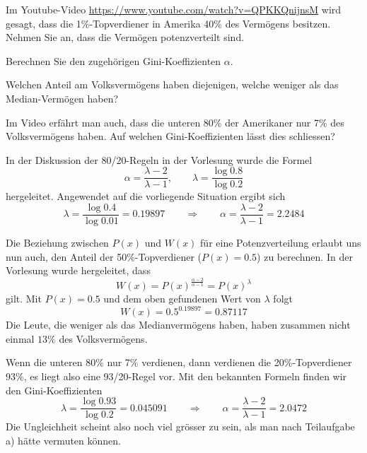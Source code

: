Im Youtube-Video \url{https://www.youtube.com/watch?v=QPKKQnijnsM} wird
gesagt, dass die 1\%-Topverdiener in Amerika 40\% des Vermögens
besitzen. Nehmen Sie an, dass die Vermögen potenzverteilt sind.
\begin{teilaufgaben}
\item
Berechnen Sie den zugehörigen Gini-Koeffizienten $\alpha$.
\item
Welchen Anteil am Volksvermögens haben diejenigen, welche
weniger als das Median-Vermögen haben?
\item
Im Video erfährt man auch, dass die unteren 80\% der Amerikaner nur
7\% des Volksvermögens haben. 
Auf welchen Gini-Koeffizienten lässt dies schliessen?
\end{teilaufgaben}


\begin{loesung}
\begin{teilaufgaben}
\item
In der Diskussion der 80/20-Regeln in der Vorlesung wurde die Formel
\[
\alpha=\frac{\lambda-2}{\lambda-1},\qquad \lambda=\frac{\log 0.8}{\log 0.2}
\]
hergeleitet. Angewendet auf die vorliegende Situation ergibt sich
\[
\lambda=\frac{\log 0.4}{\log 0.01}=0.19897
\qquad
\Rightarrow
\qquad
\alpha=\frac{\lambda - 2}{\lambda - 1}=2.2484
\]
\item
Die Beziehung zwischen $P(x)$ und $W(x)$ für eine Potenzverteilung erlaubt
uns nun auch, den Anteil der 50\%-Topverdiener ($P(x)=0.5$) zu berechnen.
In der Vorlesung wurde hergeleitet, dass 
\[
W(x)=P(x)^\frac{\alpha - 2}{\alpha - 1}=P(x)^\lambda
\]
gilt. Mit $P(x)=0.5$ und dem oben gefundenen Wert von $\lambda$
folgt
\[
W(x)=0.5^{0.19897}=0.87117
\]
Die Leute, die weniger als das Medianvermögens haben, haben zusammen
nicht einmal $13\%$ des Volksvermögens.
\item
Wenn die unteren 80\% nur 7\% verdienen, dann verdienen die 20\%-Topverdiener
93\%, es liegt also eine 93/20-Regel vor. Mit den bekannten Formeln finden
wir den Gini-Koeffizienten
\[
\lambda=\frac{\log 0.93}{\log 0.2}=0.045091
\qquad\Rightarrow\qquad
\alpha=\frac{\lambda - 2}{\lambda - 1}=2.0472
\]
Die Ungleichheit scheint also noch viel grösser zu sein, als
man nach Teilaufgabe a) hätte vermuten können.
\qedhere
\end{teilaufgaben}
\end{loesung}

